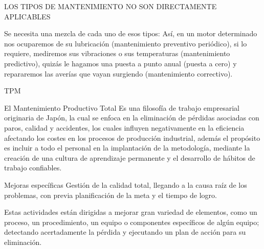 \documentclass[./pmain.tex]{subfiles}
\begin{document}
\large
{}

\begin{frame}{LOS TIPOS DE MANTENIMIENTO NO SON
DIRECTAMENTE APLICABLES}

Se necesita una mezcla de cada uno de esos tipos: Así, en un motor determinado nos ocuparemos de su lubricación (mantenimiento preventivo periódico), si lo requiere, mediremos sus vibraciones o
sus temperaturas (mantenimiento predictivo), quizás le hagamos una puesta a
punto anual (puesta a cero) y repararemos las averías que vayan surgiendo
(mantenimiento correctivo). 
\end{frame}





\begin{frame}{TPM}
\begin{block}{El Mantenimiento Productivo Total}
     Es una filosofía de trabajo empresarial originaria de Japón, la cual se enfoca en la eliminación de pérdidas asociadas con paros, calidad y accidentes, los cuales influyen negativamente en la eficiencia afectando los costes en los procesos de producción industrial, además el propósito es incluir a todo el personal en la implantación de la metodología, mediante la creación de una cultura de aprendizaje permanente y el desarrollo de hábitos de trabajo confiables.
\end{block}    
\end{frame}


\begin{frame}{Mejoras específicas}
 Gestión de la calidad total, llegando a la causa raíz de los problemas, con previa planificación de la meta y el tiempo de logro.

Estas actividades están dirigidas a mejorar gran variedad de elementos, como un proceso, un procedimiento, un equipo o componentes específicos de algún equipo; detectando acertadamente la pérdida y ejecutando un plan de acción para su eliminación.
\end{frame}
\end{document}
